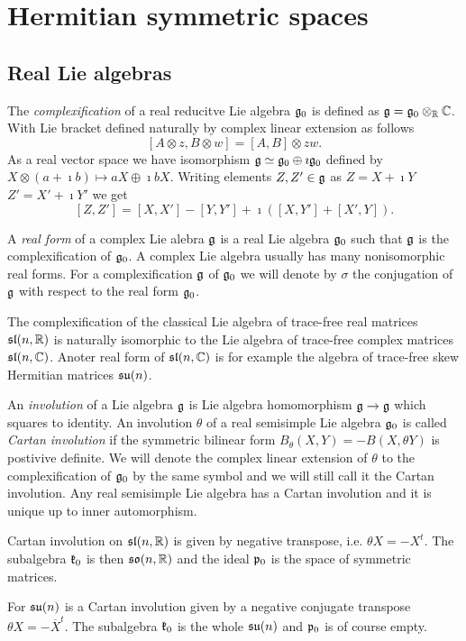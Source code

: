\chapter{Hermitian symmetric spaces}


\section{Real Lie algebras}

The \emph{complexification} of a real reducitve Lie algebra $\mathfrak{g}_0$ is defined as $\mathfrak{g} = \mathfrak{g}_0\otimes_{\mathbb{R}} \mathbb{C}$. With Lie bracket defined naturally by complex linear extension as follows
\[
 [A\otimes z, B\otimes w] = [A,B]\otimes zw.
\]
As a real vector space we have isomorphism $\mathfrak{g} \simeq \mathfrak{g}_0 \oplus \imath \mathfrak{g}_0$ defined by $X\otimes (a+\imath b) \mapsto aX \oplus \imath bX$. Writing elements $Z,Z'\in\mathfrak{g}$ as $Z = X + \imath Y$ $Z'=X'+\imath Y'$ we get \[[Z,Z'] = [X,X'] - [Y,Y'] + \imath \left( [X,Y'] + [X',Y]\right).\]

A \emph{real form} of a complex Lie alebra $\mathfrak{g}$ is a real Lie algebra $\mathfrak{g}_0$ such that $\mathfrak{g}$ is the complexification of $\mathfrak{g}_0$. A complex Lie algebra usually has many nonisomorphic real forms. For a complexification $\mathfrak{g}$ of $\mathfrak{g}_0$ we will denote by $\sigma$ the conjugation of $\mathfrak{g}$ with respect to the real form $\mathfrak{g}_0$.

\begin{example}
 The complexification of the classical Lie algebra of trace-free real matrices $\mathfrak{sl}(n,\mathbb{R})$ is naturally isomorphic to the Lie algebra of trace-free complex matrices $\mathfrak{sl}(n,\mathbb{C})$. Anoter real form of $\mathfrak{sl}(n,\mathbb{C})$ is for example the algebra of trace-free skew Hermitian  matrices  $\mathfrak{su}(n)$. %
\end{example}

An \emph{involution} of a Lie algebra $\mathfrak{g}$ is Lie algebra homomorphism $\mathfrak{g}\to\mathfrak{g}$ which squares to identity. An involution $\theta$ of a real semisimple Lie algebra $\mathfrak{g}_0$ is called \emph{Cartan involution} if the symmetric bilinear form $B_\theta(X,Y) = -B(X,\theta Y)$ is postivive definite. We will denote the complex linear extension of $\theta$ to the complexification of $\mathfrak{g}_0$ by the same symbol and we will still call it the Cartan involution. Any real semisimple Lie algebra has a Cartan involution and it is unique up to inner automorphism.

\begin{example}
  Cartan involution on $\mathfrak{sl}(n,\mathbb{R})$ is given by negative transpose, i.e. $\theta X = - X^t$. The subalgebra $\mathfrak{k}_0$ is then $\mathfrak{so}(n,\mathbb{R})$ and the ideal $\mathfrak{p}_0$ is the space of symmetric matrices.

 For $\mathfrak{su}(n)$ is a Cartan involution given by a negative conjugate transpose $\theta X = - \overline{X}^t$. The subalgebra $\mathfrak{k}_0$ is the whole $\mathfrak{su}(n)$ and $\mathfrak{p}_0$ is of course empty.
\end{example}


